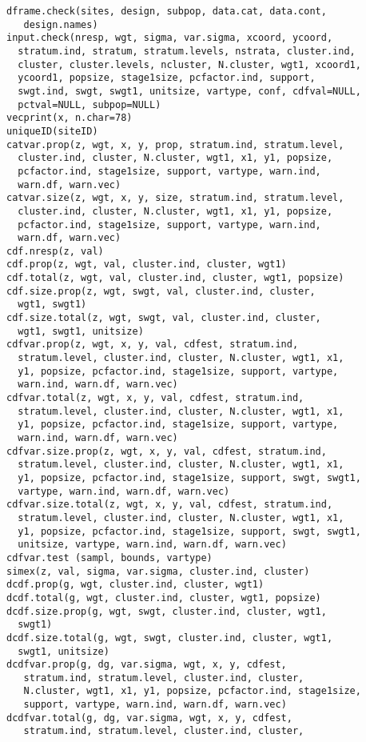 \begin{Usage}
\begin{verbatim}
dframe.check(sites, design, subpop, data.cat, data.cont,
   design.names)
input.check(nresp, wgt, sigma, var.sigma, xcoord, ycoord,
  stratum.ind, stratum, stratum.levels, nstrata, cluster.ind,
  cluster, cluster.levels, ncluster, N.cluster, wgt1, xcoord1,
  ycoord1, popsize, stage1size, pcfactor.ind, support,
  swgt.ind, swgt, swgt1, unitsize, vartype, conf, cdfval=NULL,
  pctval=NULL, subpop=NULL)
vecprint(x, n.char=78)
uniqueID(siteID)
catvar.prop(z, wgt, x, y, prop, stratum.ind, stratum.level,
  cluster.ind, cluster, N.cluster, wgt1, x1, y1, popsize,
  pcfactor.ind, stage1size, support, vartype, warn.ind,
  warn.df, warn.vec)
catvar.size(z, wgt, x, y, size, stratum.ind, stratum.level,
  cluster.ind, cluster, N.cluster, wgt1, x1, y1, popsize,
  pcfactor.ind, stage1size, support, vartype, warn.ind,
  warn.df, warn.vec)
cdf.nresp(z, val)
cdf.prop(z, wgt, val, cluster.ind, cluster, wgt1)
cdf.total(z, wgt, val, cluster.ind, cluster, wgt1, popsize)
cdf.size.prop(z, wgt, swgt, val, cluster.ind, cluster,
  wgt1, swgt1)
cdf.size.total(z, wgt, swgt, val, cluster.ind, cluster, 
  wgt1, swgt1, unitsize)
cdfvar.prop(z, wgt, x, y, val, cdfest, stratum.ind,
  stratum.level, cluster.ind, cluster, N.cluster, wgt1, x1,
  y1, popsize, pcfactor.ind, stage1size, support, vartype,
  warn.ind, warn.df, warn.vec)
cdfvar.total(z, wgt, x, y, val, cdfest, stratum.ind,
  stratum.level, cluster.ind, cluster, N.cluster, wgt1, x1,
  y1, popsize, pcfactor.ind, stage1size, support, vartype,
  warn.ind, warn.df, warn.vec)
cdfvar.size.prop(z, wgt, x, y, val, cdfest, stratum.ind,
  stratum.level, cluster.ind, cluster, N.cluster, wgt1, x1,
  y1, popsize, pcfactor.ind, stage1size, support, swgt, swgt1,
  vartype, warn.ind, warn.df, warn.vec)
cdfvar.size.total(z, wgt, x, y, val, cdfest, stratum.ind,
  stratum.level, cluster.ind, cluster, N.cluster, wgt1, x1,
  y1, popsize, pcfactor.ind, stage1size, support, swgt, swgt1,
  unitsize, vartype, warn.ind, warn.df, warn.vec)
cdfvar.test (sampl, bounds, vartype)
simex(z, val, sigma, var.sigma, cluster.ind, cluster)
dcdf.prop(g, wgt, cluster.ind, cluster, wgt1)
dcdf.total(g, wgt, cluster.ind, cluster, wgt1, popsize)
dcdf.size.prop(g, wgt, swgt, cluster.ind, cluster, wgt1,
  swgt1)
dcdf.size.total(g, wgt, swgt, cluster.ind, cluster, wgt1,
  swgt1, unitsize)
dcdfvar.prop(g, dg, var.sigma, wgt, x, y, cdfest,
   stratum.ind, stratum.level, cluster.ind, cluster,
   N.cluster, wgt1, x1, y1, popsize, pcfactor.ind, stage1size,
   support, vartype, warn.ind, warn.df, warn.vec)
dcdfvar.total(g, dg, var.sigma, wgt, x, y, cdfest,
   stratum.ind, stratum.level, cluster.ind, cluster,

\end{verbatim}
\end{Usage}
